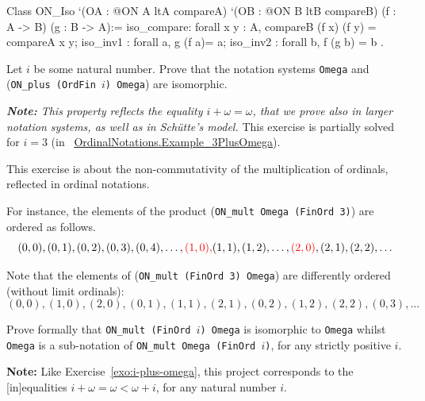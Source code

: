 
\label{types:ON-iso} 
\begin{Coqsrc}
Class  ON_Iso 
       `(OA : @ON A ltA compareA)
       `(OB : @ON B ltB  compareB)
       (f : A -> B)
       (g : B -> A):=
  {
  iso_compare: forall x y : A, 
      compareB (f x) (f y) = compareA x y;
  iso_inv1 : forall a, g (f a)= a;
  iso_inv2 : forall b, f (g b) = b
}.
\end{Coqsrc}


\begin{exercise}
\label{exo:i-plus-omega}
Let $i$ be some natural number. Prove that the notation systems 
\texttt{Omega} and (\texttt{ON\_plus (OrdFin $i$) Omega}) are isomorphic.

{\it \textbf{Note:} This property reflects the equality $i+\omega=\omega$, that we prove also in larger notation systems, as well as in Schütte's model.}
This exercise is partially solved for $i=3$ (in ~\href{../theories/html/hydras.OrdinalNotations.Example_3PlusOmega.html}{OrdinalNotations.Example\_3PlusOmega}).

\end{exercise}

\label{exo:ON-mult}
\begin{project}

This exercise is about the non-commutativity of the multiplication of ordinals, reflected in ordinal notations.

For instance, the
elements of the product (\texttt{ON\_mult Omega (FinOrd 3)}) are ordered as follows.
\[(0,0),(0,1),(0,2),(0,3),(0,4),\dots,{\color{red}(1,0),} (1,1),(1,2),\dots, {\color{red}(2,0)},(2,1),(2,2),\dots\]

Note that the elements of  (\texttt{ON\_mult (FinOrd 3) Omega}) are differently ordered (without limit ordinals):
\[(0,0),(1,0),(2,0),(0,1),(1,1),(2,1),(0,2),(1,2),(2,2),(0,3),\dots\]


Prove formally  that \texttt{ON\_mult (FinOrd $i$) Omega} is isomorphic to
\texttt{Omega}  whilst
\texttt{Omega}  is a sub-notation of \texttt{ON\_mult Omega (FinOrd $i$)},
for any strictly positive $i$. 

\textbf{Note:} Like Exercise~\ref{exo:i-plus-omega}, this project corresponds to the [in]equalities $i+\omega=\omega<\omega+i$, for any natural number $i$.
\end{project}

